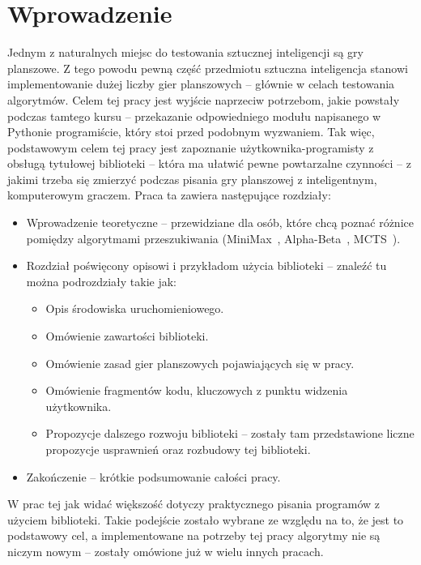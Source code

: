\documentclass[polish,shortabstract,inz]{iithesis}
\author{Mikołaj Kowalik}
\begin{document}

\chapter{Wprowadzenie}
Jednym z naturalnych miejsc do testowania sztucznej inteligencji są gry planszowe.
Z tego powodu pewną część przedmiotu sztuczna inteligencja stanowi implementowanie dużej liczby gier planszowych -- głównie w celach testowania algorytmów.
Celem tej pracy jest wyjście naprzeciw potrzebom, jakie powstały podczas tamtego kursu -- przekazanie odpowiedniego modułu napisanego w Pythonie programiście, który stoi przed podobnym wyzwaniem.
Tak więc, podstawowym celem tej pracy jest zapoznanie użytkownika-programisty z obsługą tytułowej biblioteki -- która ma ułatwić pewne powtarzalne czynności -- z jakimi trzeba się zmierzyć podczas pisania gry planszowej z inteligentnym, komputerowym graczem.
Praca ta zawiera następujące rozdziały:
\begin{itemize}
  \item Wprowadzenie teoretyczne -- przewidziane dla osób, które chcą poznać różnice pomiędzy algorytmami przeszukiwania (MiniMax~\cite{aibook,wazniak}, Alpha-Beta~\cite{aibook,wazniak}, MCTS~\cite{mcts1}).
  \item Rozdział poświęcony opisowi i przykładom użycia biblioteki -- znaleźć tu można podrozdziały takie jak:
    \begin{itemize}
      \item Opis środowiska uruchomieniowego.
      \item Omówienie zawartości biblioteki.
      \item Omówienie zasad gier planszowych pojawiających się w pracy.
      \item Omówienie fragmentów kodu, kluczowych z punktu widzenia użytkownika.
      \item Propozycje dalszego rozwoju biblioteki -- zostały tam przedstawione liczne propozycje usprawnień oraz rozbudowy tej biblioteki.
    \end{itemize}
  \item Zakończenie -- krótkie podsumowanie całości pracy.
\end{itemize}

W prac tej jak widać większość dotyczy praktycznego pisania programów z użyciem biblioteki.
Takie podejście zostało wybrane ze względu na to, że jest to podstawowy cel, a implementowane na potrzeby tej pracy algorytmy nie są niczym nowym -- zostały omówione już w wielu innych pracach.
\end{document}
